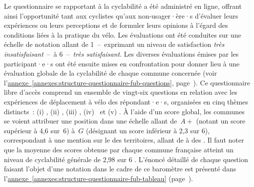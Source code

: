 \begin{refsegment}
Le questionnaire se rapportant à la cyclabilité a été administré en ligne, offrant ainsi l'opportunité tant aux cyclistes qu'aux non-usager·ère·s d'évaluer leurs expériences ou leurs perceptions et de formuler leurs opinions à l'égard des conditions liées à la pratique du vélo. Les évaluations ont été conduites sur une échelle de notation allant de 1~–~exprimant un niveau de satisfaction \textsl{très insatisfaisant}~–~à 6~–~\textsl{très satisfaisant}. Les diverses évaluations émises par les participant·e·s ont été ensuite mises en confrontation pour donner lieu à une évaluation globale de la cyclabilité de chaque commune concernée (voir l'\hyperref[annexes:structure-questionnaire-fub-questions]{annexe~\ref{annexes:structure-questionnaire-fub-questions}}, page~\pageref{annexes:structure-questionnaire-fub-questions}). Ce questionnaire libre d'accès comprend un ensemble de vingt-six questions en relation avec les expériences de déplacement à vélo des répondant·e·s, organisées en cinq thèmes distincts~: (i) , (ii) , (iii) , (iv) ~et (v) . À l'aide d'un score global, les communes se voient attribuer une position dans une échelle allant de~\(A+\) (notant un score supérieur à 4,6 sur~6) à~\(G\) (désignant un score inférieur à 2,3 sur 6), correspondant à une mention sur le  des territoires, allant de  à des  \textcolor{blue}{\autocite{fub_barometre_2021}}. Il faut noter que la moyenne des scores obtenue par chaque commune française atteint un niveau de cyclabilité générale de 2,98 sur 6 \textcolor{blue}{\autocite[17]{vermeulen_barometre_2022}}. L'énoncé détaillé de chaque question faisant l'objet d'une notation dans le cadre de ce baromètre est présenté dans l'\hyperref[annexes:structure-questionnaire-fub-tableau]{annexe~\ref{annexes:structure-questionnaire-fub-tableau}} (page~\pageref{annexes:structure-questionnaire-fub-tableau}).%



\end{refsegment}
